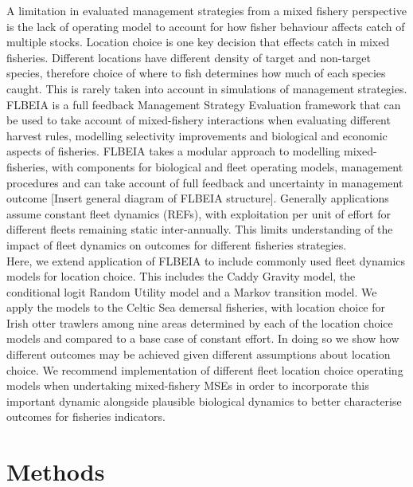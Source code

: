 \documentclass[12pt, halfline, a4paper]{ouparticle}
\begin{document}
A limitation in evaluated management strategies from a mixed fishery
perspective is the lack of operating model to account for how fisher behaviour
affects catch of multiple stocks. Location choice is one key decision that
effects catch in mixed fisheries. Different locations have different density of
target and non-target species, therefore choice of where to fish determines how
much of each species caught. This is rarely taken into account in simulations
of management strategies.\\

FLBEIA is a full feedback Management Strategy Evaluation framework that can be
used to take account of mixed-fishery interactions when evaluating different
harvest rules, modelling selectivity improvements and biological and economic
aspects of fisheries. FLBEIA takes a modular approach to modelling
mixed-fisheries, with components for biological and fleet operating models,
management procedures and can take account of full feedback and uncertainty in
management outcome [Insert general diagram of FLBEIA structure]. Generally
applications assume constant fleet dynamics (REFs), with exploitation per unit
of effort for different fleets remaining static inter-annually. This limits
understanding of the impact of fleet dynamics on outcomes for different
fisheries strategies. \\

Here, we extend application of FLBEIA to include commonly used fleet dynamics
models for location choice. This includes the Caddy Gravity model, the
conditional logit Random Utility model and a Markov transition model. We apply
the models to the Celtic Sea demersal fisheries, with location choice for Irish
otter trawlers among nine areas determined by each of the location choice
models and compared to a base case of constant effort. In doing so we show how
different outcomes may be achieved given different assumptions about location
choice. We recommend implementation of different fleet location choice
operating models when undertaking mixed-fishery MSEs in order to incorporate
this important dynamic alongside plausible biological dynamics to better
characterise outcomes for fisheries indicators. \\


\section{Methods}
\label{meth}
\end{document}
